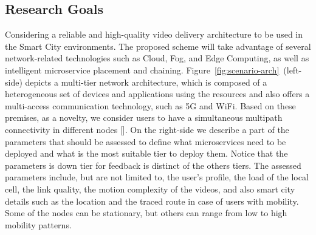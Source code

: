 
\subsection*{Research Goals}
\label{sec:research-goals}

Considering a reliable and high-quality video delivery architecture to be used in the Smart City environments. The proposed scheme will take advantage of several network-related technologies such as Cloud, Fog, and Edge Computing, as well as intelligent microservice placement and chaining. Figure~\ref{fig:scenario-arch}~(left-side) depicts a multi-tier network architecture, which is composed of a heterogeneous set of devices and applications using the resources and also offers a multi-access communication technology, such as 5G and WiFi. Based on these premises, as a novelty, we consider users to have a simultaneous multipath
connectivity in different nodes [].
On the right-side we describe a part of the parameters that should be assessed to define what microservices need to be deployed and what is the most suitable tier to deploy them. Notice that the parameters is down tier for feedback is distinct of the others tiers.
The assessed parameters include, but are not limited to, the user's profile, the load of the local cell, the link quality, the motion complexity of the videos, and also smart city details such as the location and the traced route in case of users with mobility. Some of the nodes can be stationary, but others can range from low to high mobility patterns. %

